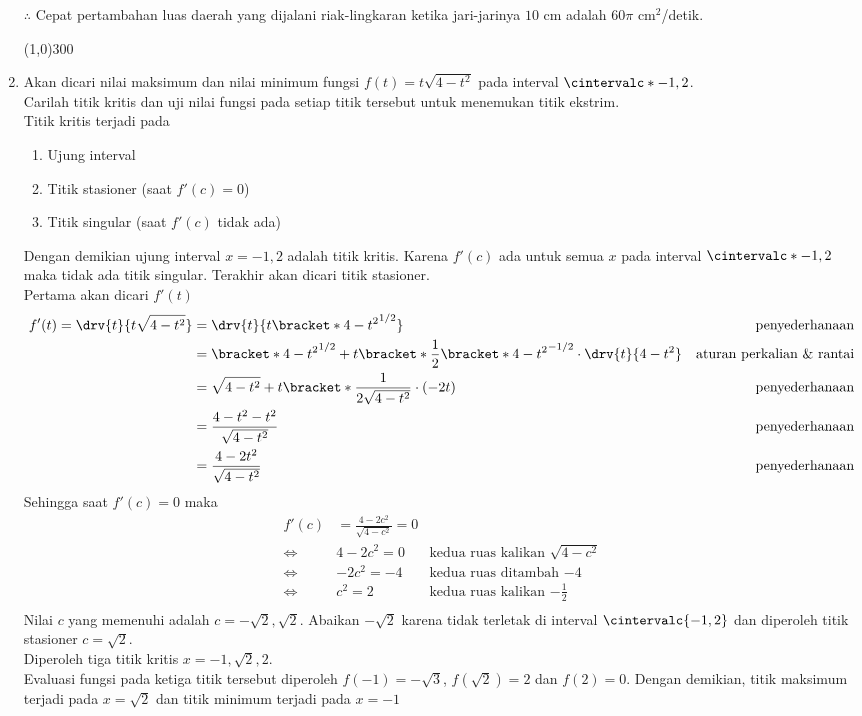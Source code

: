 \begin{enumerate}[leftmargin=*, label={\arabic*}.]
$\therefore$ Cepat pertambahan luas daerah yang dijalani riak-lingkaran ketika 
jari-jarinya $10$ cm adalah $60\pi$ cm$^{2}$/detik.
\begin{center}
    \line(1,0){300}
\end{center}

\item 
Akan dicari nilai maksimum dan nilai minimum fungsi $f(t)=t\sqrt{4-t^{2}}$ pada 
interval $\cintervalc*{-1,2}$.\\
Carilah titik kritis dan uji nilai fungsi pada setiap titik tersebut untuk menemukan 
titik ekstrim.\\
Titik kritis terjadi pada
\begin{enumerate}[label={\arabic*})]
    \item Ujung interval
    \item Titik stasioner (saat $f'(c)=0$)
    \item Titik singular (saat $f'(c)$ tidak ada)
\end{enumerate}
Dengan demikian ujung interval $x=-1,2$ adalah titik kritis. Karena $f'(c)$ ada 
untuk semua $x$ pada interval $\cintervalc*{-1,2}$ maka tidak ada titik singular. Terakhir akan 
dicari titik stasioner.\\
Pertama akan dicari $f'(t)$ 
\begin{align*}
    f'(t) = \drv{t}{t\sqrt{4-t^{2}}} 
    &= \drv{t}{t\bracket*{4-t^{2}}^{1/2}}
    &\text{penyederhanaan}\\
    &= \bracket*{4-t^2}^{1/2}+t\bracket*{\frac{1}{2}\bracket*{4-t^{2}}^{-1/2}\cdot\drv{t}{4-t^{2}}}
    &\text{aturan perkalian \& rantai}\\
    &= \sqrt{4-t^{2}}+t\bracket*{\frac{1}{2\sqrt{4-t^{2}}}\cdot (-2t)}
    &\text{penyederhanaan}\\
    &= \frac{4-t^{2}-t^{2}}{\sqrt{4-t^{2}}}
    &\text{penyederhanaan}\\
    &= \frac{4-2t^{2}}{\sqrt{4-t^{2}}}
    &\text{penyederhanaan}
\end{align*}
Sehingga saat $f'(c)=0$ maka
\begin{align*}
    f'(c) &= \frac{4-2c^{2}}{\sqrt{4-c^{2}}} = 0\\
    \iff &4-2c^{2} = 0
    &\text{kedua ruas kalikan $\sqrt{4-c^{2}}$}\\
    \iff &-2c^{2} = -4
    &\text{kedua ruas ditambah $-4$}\\
    \iff &c^2 = 2
    &\text{kedua ruas kalikan $-\frac{1}{2}$}\\
\end{align*}
Nilai $c$ yang memenuhi adalah $c=-\sqrt{2}, \sqrt{2}$. Abaikan $-\sqrt{2}$ karena 
tidak terletak di interval $\cintervalc{-1,2}$ dan diperoleh titik stasioner 
$c = \sqrt{2}$.\\
Diperoleh tiga titik kritis $x = -1,\sqrt{2},2$.\\
Evaluasi fungsi pada ketiga titik tersebut diperoleh $f(-1) = -\sqrt{3}$, 
$f(\sqrt{2})=2$ dan $f(2) = 0$. Dengan demikian, titik maksimum terjadi pada 
$x = \sqrt{2}$ dan titik minimum terjadi pada $x = -1$


\end{enumerate}
